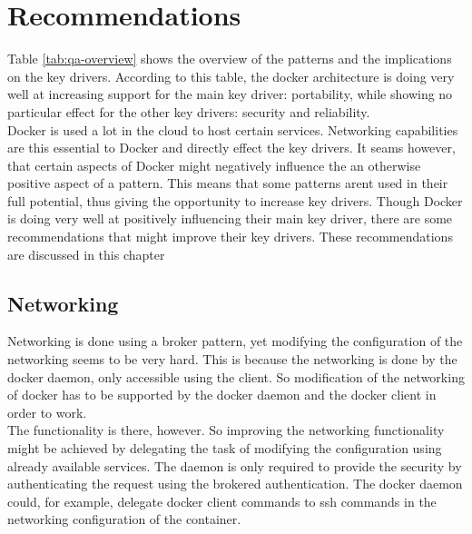 
\clearpage
\chapter{Recommendations}
\label{ch:recommendations}

Table \ref{tab:qa-overview} shows the overview of the patterns and the implications on the key drivers. According to this table, the docker architecture is doing very well at increasing support for the main key driver: portability, while showing no particular effect for the other key drivers: security and reliability.\\
Docker is used a lot in the cloud to host certain services. Networking capabilities are this essential to Docker and directly effect the key drivers. It seams however, that certain aspects of Docker might negatively influence the an otherwise positive aspect of a pattern. This means that some patterns arent used in their full potential, thus giving the opportunity to increase key drivers.
Though Docker is doing very well at positively influencing their main key driver, there are some recommendations that might improve their key drivers. These recommendations are discussed in this chapter \\


\section{Networking}
Networking is done using a broker pattern, yet modifying the configuration of the networking seems to be very hard. This is because the networking is done by the docker daemon, only accessible using the client. So modification of the networking of docker has to be supported by the docker daemon and the docker client in order to work.\\
The functionality is there, however. So improving the networking functionality might be achieved by delegating the task of modifying the  configuration using already available services. The daemon is only required to provide the security by authenticating the request using the brokered authentication. The docker daemon could, for example, delegate docker client commands to ssh commands in the networking configuration of the container. \\

%
%

